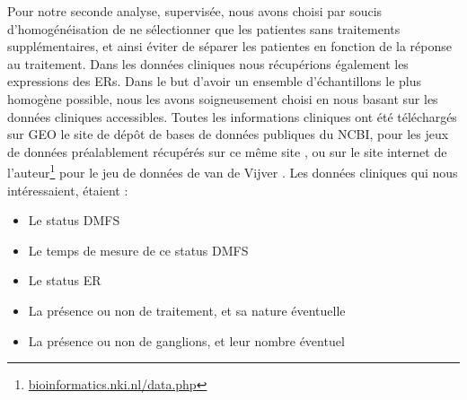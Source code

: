 			Pour notre seconde analyse, supervisée, nous avons choisi par soucis d'homogénéisation de ne sélectionner que les patientes sans traitements supplémentaires, et ainsi éviter de séparer les patientes en fonction de la réponse au traitement.
			Dans les données cliniques nous récupérions également les expressions des \aclp{ER}.
			Dans le but d'avoir un ensemble d'échantillons le plus homogène possible, nous les avons soigneusement choisi en nous basant sur les données cliniques accessibles.
			Toutes les informations cliniques ont été téléchargés sur \acs{GEO} le site de dépôt de bases de données publiques du \acs{NCBI}, pour les jeux de données préalablement récupérés sur ce même site \citep{Desmedt2008, Loi2008, Sabatier2011, Schmidt2008, Wang2005}, ou sur le site internet de l'auteur\footnote{\url{bioinformatics.nki.nl/data.php}} pour le jeu de données de van de Vijver \citep{vandevijver2002}.
			Les données cliniques qui nous intéressaient, étaient :
			\begin{itemize}
				\item Le status \acs{DMFS}
				\item Le temps de mesure de ce status \acs{DMFS}
				\item Le status \acs{ER}
				\item La présence ou non de traitement, et sa nature éventuelle
				\item La présence ou non de ganglions, et leur nombre éventuel
			\end{itemize}

